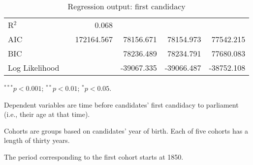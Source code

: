\begin{table}
\begin{center}
{\begin{threeparttable}
\begin{tabular}{l D{.}{.}{5.6} D{.}{.}{6.4} D{.}{.}{6.6} D{.}{.}{6.6} D{.}{.}{6.6}}
R$^2$                &                        & 0.068                  &                        &                         &                         \\
AIC                  &                        & 172164.567             & 78156.671              & 78154.973               & 77542.215               \\
BIC                  &                        &                        & 78236.489              & 78234.791               & 77680.083               \\
Log Likelihood       &                        &                        & -39067.335             & -39066.487              & -38752.108              \\
\bottomrule
\end{tabular}
\begin{tablenotes}[flushleft]
\scriptsize{
\item $^{***}p<0.001$; $^{**}p<0.01$; $^{*}p<0.05$.
\item Dependent variables are time before candidates' first candidacy to parliament (i.e., their age at that time).
\item Cohorts are groups based on candidates' year of birth. Each of five cohorts has a length of thirty years. 
\item The period corresponding to the first cohort starts at 1850.}
\end{tablenotes}
\end{threeparttable}
}
\caption{Regression output: first candidacy}
\label{table:tabreg.run}
\end{center}
\end{table}

